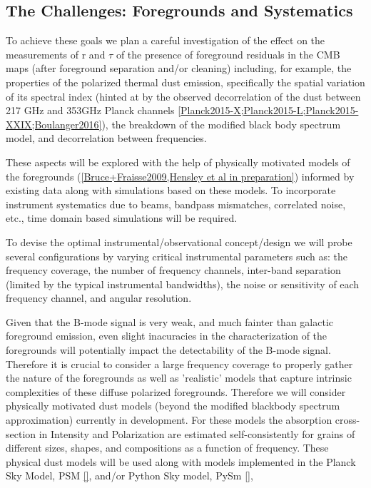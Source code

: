\subsection{The Challenges: Foregrounds and Systematics}
\label{sec:foregrounds}
\vspace{-0.05in}


To achieve these goals we plan a careful investigation of the effect on the measurements of r and $\tau$ of the presence of foreground residuals in the CMB maps (after foreground separation and/or cleaning) including, for example, the properties of the polarized thermal dust emission, specifically the spatial variation of its spectral index (hinted at by the observed decorrelation of the dust between 217 GHz and 353GHz Planck channels \ref{Planck2015-X;Planck2015-L;Planck2015-XXIX;Boulanger2016}), the breakdown of the modified black body spectrum model, and decorrelation between frequencies. 

These aspects will be explored with the help of physically motivated models of the foregrounds (\ref{Bruce+Fraisse2009,Hensley et al in preparation}) informed by existing data along with simulations based on these models. To incorporate instrument systematics due to beams, bandpass mismatches, correlated noise, etc., time domain based simulations will be required.

To devise the optimal instrumental/observational concept/design we will probe several configurations by varying critical instrumental parameters such as: the frequency coverage, the number of frequency channels, inter-band separation (limited by the typical instrumental bandwidths), the noise or sensitivity of each frequency channel, and angular resolution. 

Given that the B-mode signal is very weak, and much fainter than galactic foreground emission, even slight inacuracies in the characterization of the foregrounds will potentially impact the detectability of the B-mode signal. Therefore it is crucial to consider a large frequency coverage to properly gather the nature of the foregrounds as well as 'realistic' models that capture intrinsic complexities of these diffuse polarized foregrounds.
Therefore we will consider physically motivated dust models (beyond the modified blackbody spectrum approximation) currently in development. 
For these models the absorption cross-section in Intensity and Polarization are estimated self-consistently for grains of different sizes, shapes, and compositions as a function of frequency. These physical dust models will be used along with models implemented in the Planck Sky Model, PSM \ref{}, and/or  Python Sky model, PySm \ref{}, 


